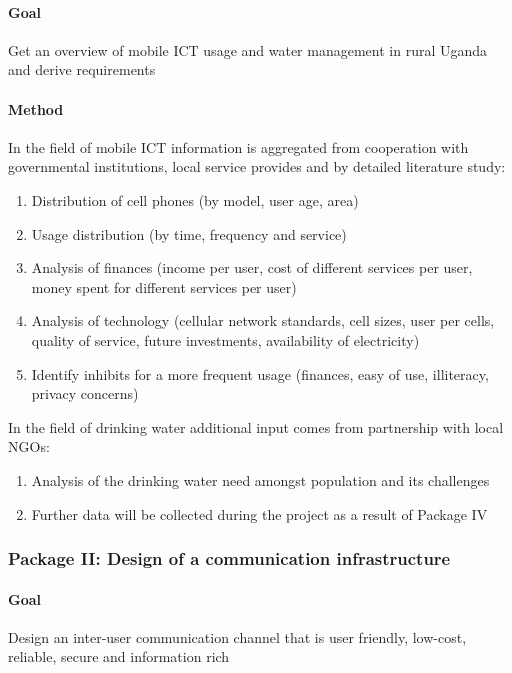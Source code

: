 \documentclass[11pt]{article}
\begin{document}
\paragraph{Goal} Get an overview of mobile ICT usage and water management in rural Uganda and derive requirements
\paragraph{Method}
In the field of mobile ICT information is aggregated from cooperation with governmental institutions, local service provides and by detailed literature study:
\begin{enumerate}
 \item Distribution of cell phones (by model, user age, area)
 \item Usage distribution (by time, frequency and service)
 \item Analysis of finances (income per user, cost of different services per user, money spent for different services per user)
 \item Analysis of technology (cellular network standards, cell sizes, user per cells, quality of service, future investments, availability of electricity)
 \item Identify inhibits for a more frequent usage (finances, easy of use, illiteracy, privacy concerns)
\end{enumerate}
In the field of drinking water additional input comes from partnership with local NGOs:
\begin{enumerate}
 \item Analysis of the drinking water need amongst population and its challenges
 \item Further data will be collected during the project as a result of Package IV
\end{enumerate}







\subsubsection*{Package II: Design of a communication infrastructure}
\paragraph{Goal} Design an inter-user communication channel that is user friendly, low-cost, reliable, secure and information rich
\end{document}
